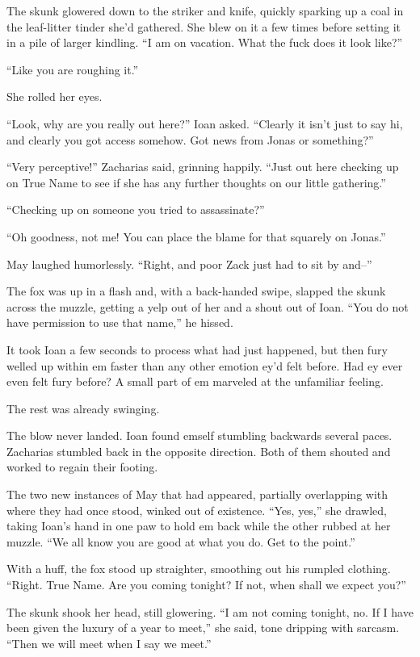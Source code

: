 The skunk glowered down to the striker and knife, quickly sparking up a coal in the leaf-litter tinder she'd gathered. She blew on it a few times before setting it in a pile of larger kindling. ``I am on vacation. What the fuck does it look like?''

``Like you are roughing it.''

She rolled her eyes.

``Look, why are you really out here?'' Ioan asked. ``Clearly it isn't just to say hi, and clearly you got access somehow. Got news from Jonas or something?''

``Very perceptive!'' Zacharias said, grinning happily. ``Just out here checking up on True Name to see if she has any further thoughts on our little gathering.''

``Checking up on someone you tried to assassinate?''

``Oh goodness, not me! You can place the blame for that squarely on Jonas.''

May laughed humorlessly. ``Right, and poor Zack just had to sit by and--''

The fox was up in a flash and, with a back-handed swipe, slapped the skunk across the muzzle, getting a yelp out of her and a shout out of Ioan. ``You do not have permission to use that name,'' he hissed.

It took Ioan a few seconds to process what had just happened, but then fury welled up within em faster than any other emotion ey'd felt before. Had ey ever even felt fury before? A small part of em marveled at the unfamiliar feeling.

The rest was already swinging.

The blow never landed. Ioan found emself stumbling backwards several paces. Zacharias stumbled back in the opposite direction. Both of them shouted and worked to regain their footing.

The two new instances of May that had appeared, partially overlapping with where they had once stood, winked out of existence. ``Yes, yes,'' she drawled, taking Ioan's hand in one paw to hold em back while the other rubbed at her muzzle. ``We all know you are good at what you do. Get to the point.''

With a huff, the fox stood up straighter, smoothing out his rumpled clothing. ``Right. True Name. Are you coming tonight? If not, when shall we expect you?''

The skunk shook her head, still glowering. ``I am not coming tonight, no. If I have been given the luxury of a year to meet,'' she said, tone dripping with sarcasm. ``Then we will meet when I say we meet.''


